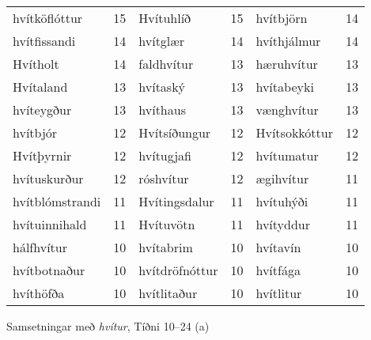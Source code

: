 \documentclass{../litmal.tex}{subfiles}
\begin{document}
\begin{wordlist}[H]
\begin{tcolorbox}
\begin{tabular}{BlBlBl}
		hvítköflóttur	& 15		& 
		Hvítuhlíð		& 15		& 
		hvítbjörn	& 14		\\  %
		hvítfissandi	& 14		& 	
		hvítglær		& 14		& 
		hvíthjálmur	& 14		\\ 	%
		Hvítholt		& 14		& 
		faldhvítur	& 13		& 
		hæruhvítur	& 13		\\ 	%
		Hvítaland	& 13		& 
		hvítaský		& 13		& 
		hvítabeyki	& 13		\\  %
		hvíteygður	& 13		& 	
		hvíthaus		& 13		& 
		vænghvítur	& 13		\\  %
		hvítbjór		& 12		& 
		Hvítsíðungur	& 12		& 
		Hvítsokkóttur	 & 12		\\  %
		Hvítþyrnir	& 12		& 	
		hvítugjafi	& 12		& 	
		hvítumatur	& 12		\\  %
		hvítuskurður	& 12		& 
		róshvítur		& 12		& 
		ægihvítur	& 11		\\  %
		hvítblómstrandi & 11		& 
		Hvítingsdalur	& 11		& 
		hvítuhýði	& 11		\\ 	%
		hvítuinnihald	& 11		& 
		Hvítuvötn	& 11		& 
		hvítyddur	& 11		\\ 	%
		hálfhvítur	& 10		& 
		hvítabrim	& 10		& 
		hvítavín		& 10		\\  %
		hvítbotnaður	& 10		& 
		hvítdröfnóttur & 10		& 
		hvítfága		& 10		\\  %
		hvíthöfða	& 10		& 	
		hvítlitaður	& 10		& 
		hvítlitur		& 10		  %
	\end{tabular}
	
\end{tcolorbox}
	\caption{Samsetningar með \textit{hvítur}, Tíðni 10--24 (a)}
	\label{listi:hvitt.10a}
\end{wordlist}	
\end{document}
